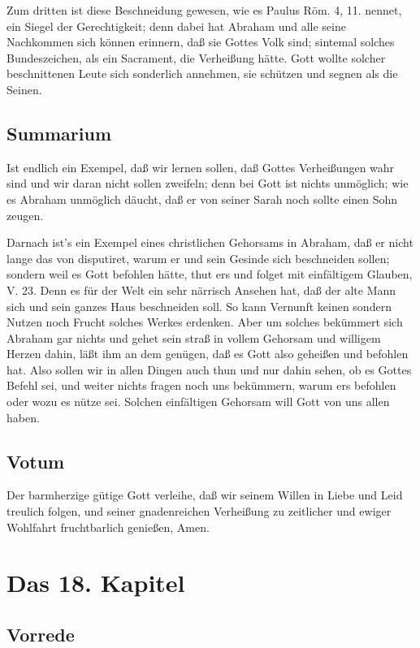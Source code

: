 Zum dritten ist diese Beschneidung gewesen,
wie es Paulus Röm. 4, 11. nennet, ein Siegel der Gerechtigkeit; denn dabei hat Abraham und alle seine Nachkommen sich können erinnern, daß sie Gottes Volk sind; sintemal solches Bundeszeichen, als ein Sacrament, die Verheißung hätte. Gott wollte solcher beschnittenen Leute sich sonderlich annehmen, sie schützen und segnen als die Seinen.

\section{Summarium}

Ist endlich ein Exempel, daß wir lernen sollen, daß Gottes Verheißungen wahr sind und wir daran nicht sollen zweifeln; denn bei Gott ist nichts unmöglich; wie es Abraham unmöglich däucht, daß er von seiner Sarah noch sollte einen Sohn zeugen.

Darnach ist's ein Exempel eines christlichen Gehorsams in Abraham, daß er nicht lange das von disputiret, warum er und sein Gesinde sich beschneiden sollen; sondern weil es Gott befohlen hätte, thut ers und folget mit einfältigem Glauben, V. 23. Denn es für der Welt ein sehr närrisch Ansehen hat, daß der alte Mann sich und sein ganzes Haus beschneiden soll. So kann Vernunft keinen sondern Nutzen noch Frucht solches Werkes erdenken. Aber um solches bekümmert sich Abraham gar nichts und gehet sein straß in vollem Gehorsam und willigem Herzen dahin, läßt ihm an dem genügen, daß es Gott also geheißen und befohlen hat. Also sollen wir in allen Dingen auch thun und nur dahin sehen, ob es Gottes Befehl sei, und weiter nichts fragen noch uns bekümmern, warum ers befohlen oder wozu es nütze sei. Solchen einfältigen Gehorsam will Gott von uns allen haben.

\section{Votum}

Der barmherzige gütige Gott verleihe, daß wir seinem Willen in Liebe und Leid treulich folgen, und seiner gnadenreichen Verheißung zu zeitlicher und ewiger Wohlfahrt fruchtbarlich genießen, Amen.

\chapter{Das 18. Kapitel}

\section{Vorrede}

